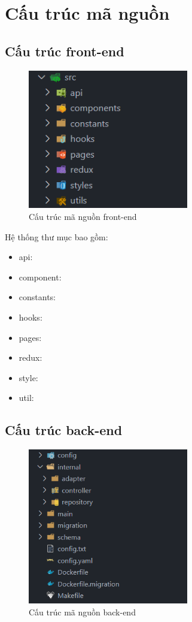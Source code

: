 \section{Cấu trúc mã nguồn}
\subsection{Cấu trúc front-end}
\begin{figure}[!htp]
    \begin{center}
        \includegraphics[width=7cm]{img/file-structure/front-end.png}
    \end{center}
    \caption{Cấu trúc mã nguồn front-end}
\end{figure}

Hệ thống thư mục bao gồm:
\begin{itemize}
    \item api:
    \item component:
    \item constants:
    \item hooks:
    \item pages:
    \item redux:
    \item style:
    \item util:
\end{itemize}


\subsection{Cấu trúc back-end}
\begin{figure}[!htp]
    \begin{center}
        \includegraphics[width=7cm]{img/file-structure/back-end.png}
    \end{center}
    \caption{Cấu trúc mã nguồn back-end}
\end{figure}

